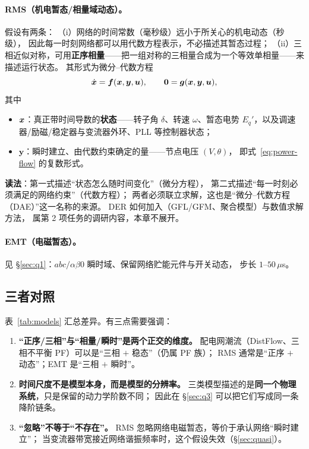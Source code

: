 \paragraph{RMS（机电暂态/相量域动态）。}
假设有两条：
（i）网络的时间常数（毫秒级）远小于所关心的机电动态（秒级），
因此每一时刻网络都可以用代数方程表示，不必描述其暂态过程；
（ii）三相近似对称，可用\textbf{正序相量}——把一组对称的三相量合成为一个等效单相量——来描述运行状态。
其形式为微分--代数方程\cite{machowski2020,milano2010}
\begin{equation}
\dot{\bm{x}}=\bm{f}(\bm{x},\bm{y},\bm{u}),\qquad
\bm{0}=\bm{g}(\bm{x},\bm{y},\bm{u}),
\label{eq:rms-dae}
\end{equation}
其中
\begin{itemize}[leftmargin=1.6em]
\item $\bm{x}$：真正带时间导数的\textbf{状态}——转子角 $\delta$、转速 $\omega$、暂态电势
$E_q'$，以及调速器/励磁/稳定器与变流器外环、PLL 等控制器状态；
\item $\bm{y}$：瞬时建立、由代数约束确定的量——节点电压 $(V,\theta)$，
即式~\eqref{eq:power-flow} 的复数形式。
\end{itemize}
\textbf{读法}：第一式描述“状态怎么随时间变化”（微分方程），
第二式描述“每一时刻必须满足的网络约束”（代数方程）；
两者必须联立求解，这也是“微分--代数方程（DAE）”这一名称的来源。
DER 如何加入（GFL/GFM、聚合模型\cite{hang2021}）与数值求解方法，
属第 2 项任务的调研内容，本章不展开。

\paragraph{EMT（电磁暂态）。}
见 \S\ref{sec:q1}：$abc/\alpha\beta0$ 瞬时域、保留网络贮能元件与开关动态，
步长 $1\text{--}50\,\mu$s。

\subsection{三者对照}

表~\ref{tab:models} 汇总差异。有三点需要强调：
\begin{enumerate}[leftmargin=1.6em]
\item \textbf{“正序/三相”与“相量/瞬时”是两个正交的维度。}
配电网潮流（DistFlow、三相不平衡 PF）可以是“三相 $+$ 稳态”（仍属 PF 族）；
RMS 通常是“正序 $+$ 动态”；EMT 是“三相 $+$ 瞬时”。
\item \textbf{时间尺度不是模型本身，而是模型的分辨率。}
三类模型描述的是\textbf{同一个物理系统}，只是保留的动力学阶数不同；
因此在 \S\ref{sec:q3} 可以把它们写成同一条降阶链条。
\item \textbf{“忽略”不等于“不存在”。}
RMS 忽略网络电磁暂态，等价于承认网络“瞬时建立”；
当变流器带宽接近网络谐振频率时，这个假设失效（\S\ref{sec:quasi}）。
\end{enumerate}

